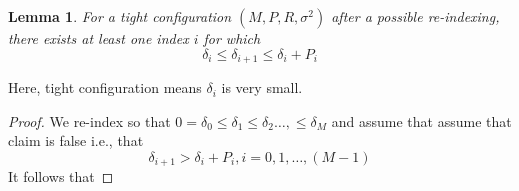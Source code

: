 \documentclass{article}
\newtheorem{lemma}{Lemma}
\begin{document}
\begin{lemma}
For a tight configuration $\left( M, P, R, \sigma^2\right)$ after a possible re-indexing, there exists at least one index $i$ for which 
	\begin{equation}
		\delta_i \leq \delta_{i+1}\leq \delta_i + P_i \label{7}
	\end{equation}
\end{lemma}
Here, tight configuration means  $\delta_i$ is very small.
\begin{proof}
	We re-index so that $ 0=\delta_0 \leq \delta_1 \leq \delta_2 \dots , \leq \delta_M $ and assume that assume that claim is false i.e., that
	\begin{equation}
		\delta_{i+1} > \delta_i + P_i, i = 0,1, \dots, (M-1)
	\end{equation}
	It follows that
	

\end{proof}
\end{document}
